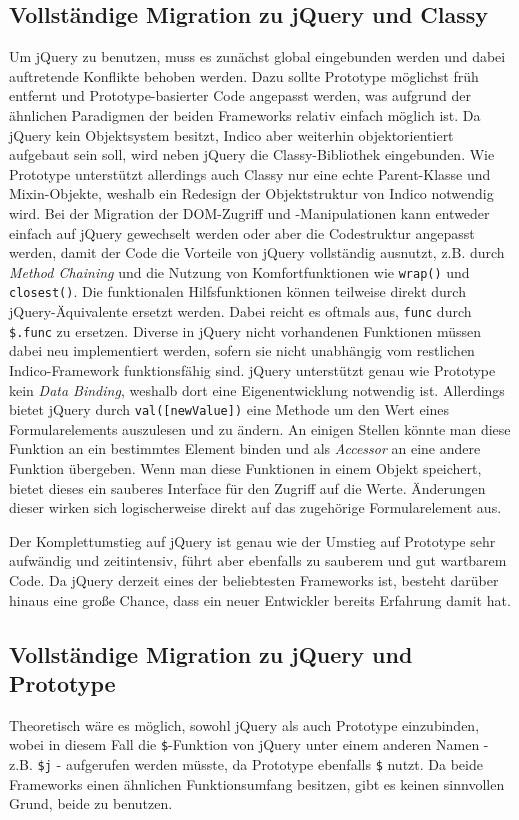 \subsection{Vollständige Migration zu jQuery und Classy}
Um jQuery zu benutzen, muss es zunächst global eingebunden werden und dabei auftretende Konflikte
behoben werden. Dazu sollte Prototype möglichst früh entfernt und Prototype-basierter Code angepasst
werden, was aufgrund der ähnlichen Paradigmen der beiden Frameworks relativ einfach möglich ist.
Da jQuery kein Objektsystem besitzt, Indico aber weiterhin objektorientiert aufgebaut sein soll,
wird neben jQuery die Classy-Bibliothek eingebunden. Wie Prototype unterstützt allerdings auch
Classy nur eine echte Parent-Klasse und Mixin-Objekte, weshalb ein Redesign der Objektstruktur von
Indico notwendig wird. Bei der Migration der DOM-Zugriff und -Manipulationen kann entweder einfach
auf jQuery gewechselt werden oder aber die Codestruktur angepasst werden, damit der Code die
Vorteile von jQuery vollständig ausnutzt, z.B. durch \emph{Method Chaining} und die
Nutzung von Komfortfunktionen wie \lstinline{wrap()} und \lstinline{closest()}. Die funktionalen
Hilfsfunktionen können teilweise direkt durch jQuery-Äquivalente ersetzt werden. Dabei reicht es
oftmals aus, \lstinline{func} durch \lstinline{$.func} zu ersetzen. Diverse in jQuery nicht
vorhandenen Funktionen müssen dabei neu implementiert werden, sofern sie nicht unabhängig vom
restlichen Indico-Framework funktionsfähig sind. jQuery unterstützt genau wie Prototype kein
\emph{Data Binding}, weshalb dort eine Eigenentwicklung notwendig ist. Allerdings bietet jQuery
durch \lstinline{val([newValue])} eine Methode um den Wert eines Formularelements auszulesen und zu
ändern. An einigen Stellen könnte man diese Funktion an ein bestimmtes Element binden und als
\emph{Accessor} an eine andere Funktion übergeben. Wenn man diese Funktionen in einem Objekt
speichert, bietet dieses ein sauberes Interface für den Zugriff auf die Werte. Änderungen dieser
wirken sich logischerweise direkt auf das zugehörige Formularelement aus.

Der Komplettumstieg auf jQuery ist genau wie der Umstieg auf Prototype sehr aufwändig und
zeitintensiv, führt aber ebenfalls zu sauberem und gut wartbarem Code. Da jQuery derzeit eines der
beliebtesten Frameworks ist, besteht darüber hinaus eine große Chance, dass ein neuer Entwickler
bereits Erfahrung damit hat.


\subsection{Vollständige Migration zu jQuery und Prototype}
Theoretisch wäre es möglich, sowohl jQuery als auch Prototype einzubinden, wobei in diesem Fall die
\lstinline{$}-Funktion von jQuery unter einem anderen Namen - z.B. \lstinline{$j} -
aufgerufen werden müsste, da Prototype ebenfalls \lstinline{$} nutzt. Da beide Frameworks einen
ähnlichen Funktionsumfang besitzen, gibt es keinen sinnvollen Grund, beide zu benutzen.


